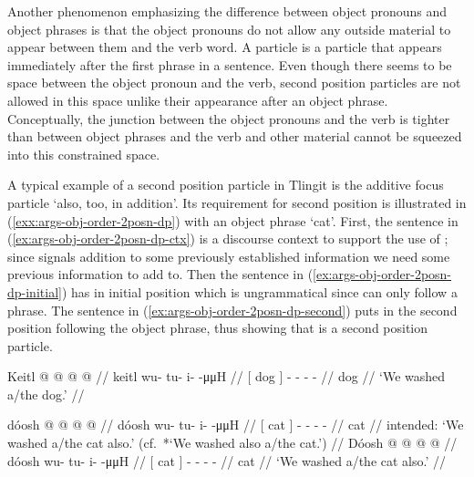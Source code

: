 Another phenomenon emphasizing the difference between object pronouns and object phrases is that the object pronouns do not allow any outside material to appear between them and the verb word. A  particle is a particle that appears immediately after the first phrase in a sentence. Even though there seems to be space between the object pronoun and the verb, second position particles are not allowed in this space unlike their appearance after an object phrase. Conceptually, the junction between the object pronouns and the verb is tighter than between object phrases and the verb and other material cannot be squeezed into this constrained space.

A typical example of a second position particle in Tlingit is the additive focus particle  ‘also, too, in addition’. Its requirement for second position is illustrated in (\ref{exx:args-obj-order-2posn-dp}) with an object phrase  ‘cat’. First, the sentence in (\ref{ex:args-obj-order-2posn-dp-ctx}) is a discourse context to support the use of ; since  signals addition to some previously established information we need some previous information to add to. Then the sentence in (\ref{ex:args-obj-order-2posn-dp-initial}) has  in initial position which is ungrammatical since  can only follow a phrase. The sentence in (\ref{ex:args-obj-order-2posn-dp-second}) puts  in the second position following the object phrase, thus showing that  is a second position particle.

\ex\label{ex:args-obj-order-2posn-dp-ctx}%
%
\begingl
	\gla	{} Keitl {}  @ {} @ {} @ {} @ {} //
	\glb	{} keitl {} wu- tu- i-  -μμH //
	\glc	{}[ dog {}] - - -  - //
	\gld	{} dog {}  {} {} {} {} //
	\glft	‘We washed a/the dog.’
		//
\endgl
\xe

\pex\label{exx:args-obj-order-2posn-dp}%
\a\label{ex:args-obj-order-2posn-dp-initial}%
%
\ljudge{*}%
\begingl
	\gla	{} {} dóosh {}  @ {} @ {} @ {} @ {} //
	\glb	{} {} dóosh {} wu- tu- i-  -μμH //
	\glc	{} {}[ cat {}] - - -  - //
	\gld	{} {} cat {}  {} {} {} {} //
	\glft	intended: ‘We washed a/the cat also.’ (cf.\ *‘We washed also a/the cat.’)
		//
\endgl
\a\label{ex:args-obj-order-2posn-dp-second}%
%
\begingl
	\gla	{} Dóosh {}   @ {} @ {} @ {} @ {} //
	\glb	{} dóosh {}  wu- tu- i-  -μμH //
	\glc	{}[ cat {}]  - - -  - //
	\gld	{} cat {}   {} {} {} {} //
	\glft	‘We washed a/the cat also.’
		//
\endgl
\xe

